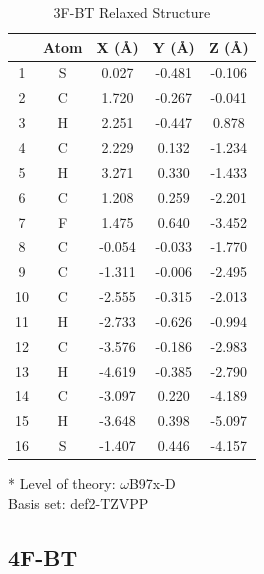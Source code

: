 \begin{table}[hbt!]\centering
\caption{3F-BT Relaxed Structure}
\renewcommand{\arraystretch}{1.5}
\begin{threeparttable}
\begin{tabular}{ccccc}\toprule
{} & {Atom} & {X (\AA)} & {Y (\AA)} & {Z (\AA)} \\ \midrule
   1 & S & 0.027 & -0.481 & -0.106\\
    2 & C & 1.720 & -0.267 & -0.041\\
    3 & H & 2.251 & -0.447 & 0.878\\
    4 & C & 2.229 & 0.132 & -1.234\\
    5 & H & 3.271 & 0.330 & -1.433\\
    6 & C & 1.208 & 0.259 & -2.201\\
    7 & F & 1.475 & 0.640 & -3.452\\
    8 & C & -0.054 & -0.033 & -1.770\\
    9 & C & -1.311 & -0.006 & -2.495\\
    10 & C & -2.555 & -0.315 & -2.013\\
    11 & H & -2.733 & -0.626 & -0.994\\
    12 & C & -3.576 & -0.186 & -2.983\\
    13 & H & -4.619 & -0.385 & -2.790\\
    14 & C & -3.097 & 0.220 & -4.189\\
    15 & H & -3.648 & 0.398 & -5.097\\
    16 & S & -1.407 & 0.446 & -4.157\\ \bottomrule
\end{tabular}
\begin{tablenotes}
\item[*] \footnotesize Level of theory: $\omega$B97x-D \\ Basis set: def2-TZVPP
\end{tablenotes}
\end{threeparttable}
\end{table}

\clearpage
\subsection{4F-BT}


